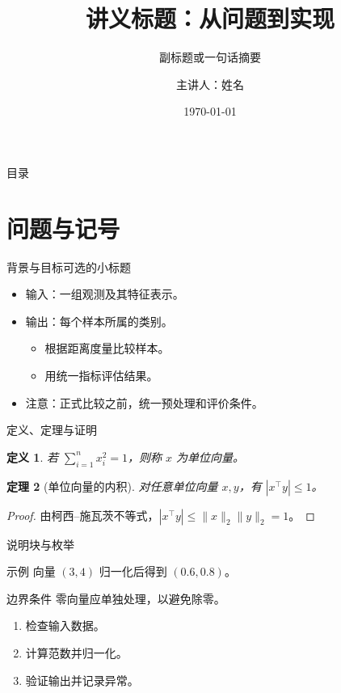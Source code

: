 \documentclass[aspectratio=169,11pt,notheorems]{beamer}
\title{讲义标题：从问题到实现}
\subtitle{副标题或一句话摘要}
\author{主讲人：姓名}
\institute{单位／课程名称}
\date{\today}
\newtheorem{theorem}{定理}[section]
\newtheorem{definition}[theorem]{定义}
\begin{document}
\begin{frame}
  \titlepage
\end{frame}

\begin{frame}{目录}
  \tableofcontents
\end{frame}

\section{问题与记号}

\begin{frame}{背景与目标}{可选的小标题}
  \begin{itemize}
    \item 输入：一组观测及其特征表示。
    \item 输出：每个样本所属的类别。
      \begin{itemize}
        \item 根据距离度量比较样本。
        \item 用统一指标评估结果。
      \end{itemize}
    \item \alert{注意：}正式比较之前，统一预处理和评价条件。
  \end{itemize}
\end{frame}

\begin{frame}{定义、定理与证明}
  \begin{definition}
    若 $\sum_{i=1}^{n}x_i^2=1$，则称 $x$ 为单位向量。
  \end{definition}
  \begin{theorem}[单位向量的内积]
    对任意单位向量 $x,y$，有 $|x^\top y|\leq 1$。
  \end{theorem}
  \begin{proof}
    由柯西–施瓦茨不等式，$|x^\top y|\leq\|x\|_2\|y\|_2=1$。
  \end{proof}
\end{frame}

\begin{frame}{说明块与枚举}
  \begin{exampleblock}{示例}
    向量 $(3,4)$ 归一化后得到 $(0.6,0.8)$。
  \end{exampleblock}
  \begin{alertblock}{边界条件}
    零向量应单独处理，以避免除零。
  \end{alertblock}
  \begin{enumerate}
    \item 检查输入数据。
    \item 计算范数并归一化。
    \item 验证输出并记录异常。
  \end{enumerate}
\end{frame}
\end{document}
